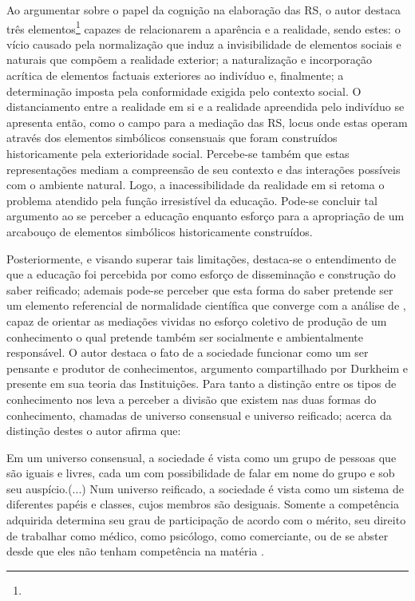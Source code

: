 \documentclass[
  12pt,       %
  openright,      %
  twoside,      %
  a4paper,      %
  english,      %
  french,       %
  spanish,      %
  brazil        %
  ]{abntex2}
\begin{document}
Ao argumentar sobre o papel da cognição na elaboração das RS, o autor destaca três elementos\footnote{} capazes de relacionarem a aparência e a realidade, sendo estes: o vício causado pela normalização que induz a invisibilidade de elementos sociais e naturais que compõem a realidade exterior; a naturalização e incorporação acrítica de elementos factuais exteriores ao indivíduo e, finalmente; a determinação imposta pela conformidade exigida pelo contexto social. O distanciamento entre a realidade em si e a realidade apreendida pelo indivíduo se apresenta então, como o campo para a mediação das RS, locus onde estas operam através dos elementos simbólicos consensuais que foram construídos historicamente pela exterioridade social. Percebe-se também que estas representações mediam a compreensão de seu contexto e das interações possíveis com o ambiente natural. Logo, a inacessibilidade da realidade em si retoma o problema atendido pela função irresistível da educação. Pode-se concluir tal argumento ao se perceber a educação enquanto esforço para a apropriação de um arcabouço de elementos simbólicos historicamente construídos.

Posteriormente, e visando superar tais limitações, destaca-se o entendimento de que a educação foi percebida por  como esforço de disseminação e construção do saber reificado; ademais pode-se perceber que esta forma do saber pretende ser um elemento referencial de normalidade científica que converge com a análise de , capaz de orientar as mediações vividas no esforço coletivo de produção de um conhecimento o qual pretende também ser socialmente e ambientalmente responsável. O autor destaca o fato de a sociedade funcionar como um ser pensante e produtor de conhecimentos, argumento compartilhado por Durkheim e presente em sua teoria das Instituições. Para tanto a distinção entre os tipos de conhecimento nos leva a perceber a divisão que existem nas duas formas do conhecimento, chamadas de universo consensual e universo reificado; acerca da distinção destes o autor afirma que:

\begin{citacao}
Em um universo consensual, a sociedade
é vista como um grupo de pessoas que são iguais e livres, cada um
com possibilidade de falar em nome do grupo e sob seu auspício.(...)
Num universo reificado, a sociedade é vista como um sistema
de diferentes papéis e classes, cujos membros são desiguais. 
Somente a competência adquirida determina seu grau de participação
de acordo com o mérito, seu direito de trabalhar como médico, 
como psicólogo, como comerciante, ou de se abster desde
que eles não tenham competência na matéria \cite[p.50-51]{Representacees_sociais_moscovici}.
\end{citacao}
\end{document}
